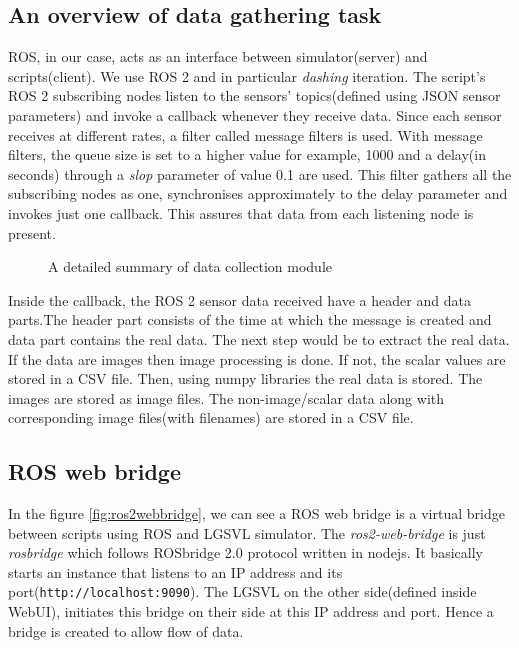 \subsection{An overview of data gathering task}
ROS, in our case, acts as an interface between simulator(server) and scripts(client).
We use ROS 2 and in particular \textit{dashing} iteration.
The script's ROS 2 subscribing nodes listen to the sensors' topics(defined using JSON
sensor parameters) and invoke a callback whenever they receive data. Since each sensor receives at different rates, a
filter called message filters is used. With message filters, the queue size is set to a
higher value for example, 1000 and a delay(in seconds) through a \textit{slop} parameter of value
0.1 are used. This filter gathers all the subscribing nodes as one, synchronises
approximately to the delay parameter and invokes just one callback. This assures that data
from each listening node is present.
\begin{figure}[!ht]
	\centering
    \def\svgwidth{\textwidth}
    \caption{A detailed summary of data collection module}
    \label{fig:datacollectionmodule}
\end{figure}

Inside the callback, the ROS 2 sensor data received have a header and data parts.The header part consists of the time at which the message is created and data part
contains the real data. The next step would be to extract the real data. If the data are images then image processing is
done. If not, the scalar values are stored in a CSV file. Then, using numpy libraries the
real data is stored. The images are stored as image files. The non-image/scalar data  along
with corresponding image files(with filenames) are
stored in a CSV file.

\subsection{ROS web bridge}
In the figure \ref{fig:ros2webbridge}, we can see a ROS web bridge is a virtual bridge between
scripts using ROS and LGSVL simulator.
The \textit{ros2-web-bridge} is just \textit{rosbridge} which follows ROSbridge 2.0 protocol
written in nodejs. It basically starts an instance
that listens to an IP address and its port(\texttt{http://localhost:9090}). The LGSVL on the other side(defined inside
WebUI), initiates this bridge on their side at this IP address and port. Hence a bridge is created to allow flow of data.

